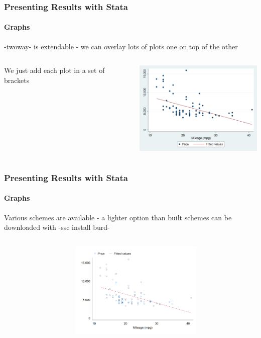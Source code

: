 \documentclass{beamer}
\begin{document}
\begin{frame}
  \frametitle{Presenting Results with Stata}
  \framesubtitle{Graphs}
-twoway- is extendable - we can overlay lots of plots one on top of the other
\begin{columns}[onlytextwidth]
  \begin{column}{5.5cm}
We just add each plot in a set of brackets

  \end{column}
  \begin{column}{6cm}
\includegraphics[width=2.5in]{../../word/overlay.PNG}
  \end{column}
\end{columns}

\end{frame}

\begin{frame}
  \frametitle{Presenting Results with Stata}
  \framesubtitle{Graphs}
Various schemes are available -  a lighter option than built schemes can be downloaded with -ssc install burd-
\begin{columns}[onlytextwidth]
  \begin{column}{5.5cm}

  \end{column}
  \begin{column}{6cm}
\includegraphics[width=2.5in]{../../word/scheme.PNG}
  \end{column}
\end{columns}

\end{frame}
\end{document}
